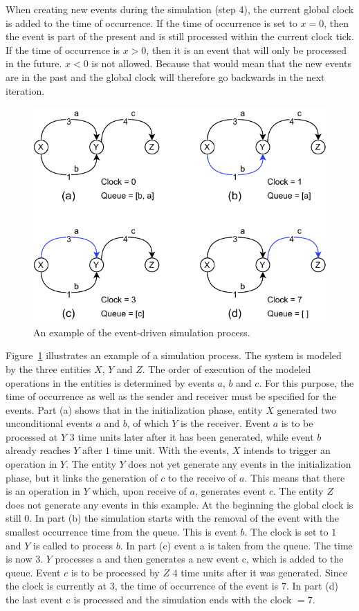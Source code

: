 \documentclass[english,version-2019-11]{uzl-thesis}
\begin{document}
When creating new events during the simulation (step 4), the current global clock is added to the time of occurrence. If the time of occurrence is set to $x = 0$, then the event is part of the present and is still processed within the current clock tick. If the time of occurrence is $x > 0$, then it is an event that will only be processed in the future. $x < 0$ is not allowed. Because that would mean that the new events are in the past and the global clock will therefore go backwards in the next iteration.
\begin{figure}[htpb]
  \centering
  \includegraphics{figure_des.pdf}
  \caption{An example of the event-driven simulation process.}
  \label{figure_des}
\end{figure}

Figure~\ref{figure_des} illustrates an example of a simulation process. The system is modeled by the three entities $X$, $Y$ and $Z$. The order of execution of the modeled operations in the entities is determined by events $a$, $b$ and $c$. For this purpose, the time of occurrence as well as the sender and receiver must be specified for the events. Part (a) shows that in the initialization phase, entity $X$ generated two unconditional events $a$ and $b$, of which $Y$ is the receiver. Event $a$ is to be processed at $Y$ $3$ time units later after it has been generated, while event $b$ already reaches $Y$ after $1$ time unit. With the events, $X$ intends to trigger an operation in $Y$. The entity $Y$ does not yet generate any events in the initialization phase, but it links the generation of $c$ to the receive of $a$.
This means that there is an operation in $Y$ which, upon receive of $a$, generates event $c$. The entity $Z$ does not generate any events in this example. At the beginning the global clock is still $0$. In part (b) the simulation starts with the removal of the event with the smallest occurrence time from the queue. This is event $b$. The clock is set to $1$ and $Y$ is called to process $b$. In part (c) event a is taken from the queue. The time is now $3$. $Y$ processes a and then generates a new event c, which is added to the queue. Event $c$ is to be processed by $Z$ $4$ time units after it was generated. Since the clock is currently at $3$, the time of occurrence of the event is $7$. In part (d) the last event c is processed and the simulation ends with the clock $= 7$.
\end{document}
